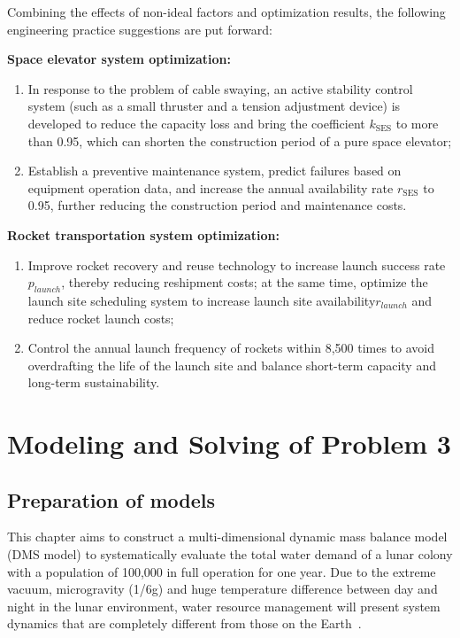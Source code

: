 Combining the effects of non-ideal factors and optimization results, the following engineering practice suggestions are put forward:

\noindent\textbf{Space elevator system optimization:}
\begin{enumerate}
  \item In response to the problem of cable swaying, an active stability control system (such as a small thruster and a tension adjustment device) is developed to reduce the capacity loss and bring the coefficient \(k_{\text{SES}}\) to more than 0.95, which can shorten the construction period of a pure space elevator;
  \item Establish a preventive maintenance system, predict failures based on equipment operation data, and increase the annual availability rate \(r_{\text{SES}}\) to 0.95, further reducing the construction period and maintenance costs.
\end{enumerate}

\noindent\textbf{Rocket transportation system optimization:}
\begin{enumerate}
  \item Improve rocket recovery and reuse technology to increase launch success rate\(p_{launch}\), thereby reducing reshipment costs; at the same time, optimize the launch site scheduling system to increase launch site availability\(r_{launch}\) and reduce rocket launch costs;
  \item Control the annual launch frequency of rockets within 8,500 times to avoid overdrafting the life of the launch site and balance short-term capacity and long-term sustainability.
\end{enumerate}


\section{Modeling and Solving of Problem 3}
\subsection{Preparation of models}
This chapter aims to construct a multi-dimensional dynamic mass balance model (DMS model) to systematically evaluate the total water demand of a lunar colony with a population of 100,000 in full operation for one year.
Due to the extreme vacuum, microgravity (1/6g) and huge temperature difference between day and night in the lunar environment, water resource management will present system dynamics that are completely different from those on the Earth~\cite{water_electrolysis_2013}.

